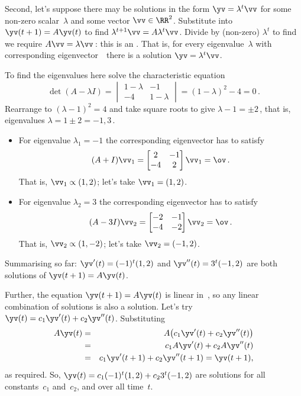 \begin{example}
\begin{solution}
Second, let's suppose there may be solutions in the form \(\yv=\lambda^t\vv\) for some non-zero scalar~\(\lambda\) and some vector \(\vv\in\RR^2\).
Substitute into \(\yv(t+1)=A\yv(t)\) to find \(\lambda^{t+1}\vv=A\lambda^t\vv\). 
Divide by (non-zero) \(\lambda^t\) to find we require \(A\vv=\lambda\vv\)\,: this is an .
That is, for every eigenvalue~\(\lambda\) with corresponding eigenvector~\vv\ there is a solution \(\yv=\lambda^t\vv\).

To find the eigenvalues here solve the characteristic equation 
\begin{equation*}
\det(A-\lambda I)=\begin{vmatrix} 1-\lambda&-1\\-4&1-\lambda \end{vmatrix}=(1-\lambda)^2-4=0\,.
\end{equation*}
Rearrange to \((\lambda-1)^2=4\) and take square roots to give \(\lambda-1=\pm2\)\,, that is, eigenvalues \(\lambda=1\pm2=-1,3\)\,.
\begin{itemize}
\item For eigenvalue \(\lambda_1=-1\) the corresponding eigenvector has to satisfy
\begin{equation*}
(A+I)\vv_1=\begin{bmatrix} 2&-1\\-4&2 \end{bmatrix}\vv_1=\ov\,.
\end{equation*}
That is, \(\vv_1\propto (1,2)\); let's take \(\vv_1=(1,2)\).

\item For eigenvalue \(\lambda_2=3\) the corresponding eigenvector has to satisfy
\begin{equation*}
(A-3I)\vv_2=\begin{bmatrix} -2&-1\\-4&-2 \end{bmatrix}\vv_2=\ov\,.
\end{equation*}
That is, \(\vv_2\propto (1,-2)\); let's take \(\vv_2=(-1,2)\).
\end{itemize}
Summarising so far: \(\yv'(t)=(-1)^t(1,2)\) and \(\yv''(t)=3^t(-1,2)\) are both solutions of \(\yv(t+1)=A\yv(t)\).

Further, the equation \(\yv(t+1)=A\yv(t)\) is linear in~\yv, so any linear combination of solutions is also a solution.
Let's try \(\yv(t)=c_1\yv'(t)+c_2\yv''(t)\).
Substituting
\begin{eqnarray*}
A\yv(t)&=&A\big(c_1\yv'(t)+c_2\yv''(t)\big)
\\&=&c_1A\yv'(t)+c_2A\yv''(t)
\\&=&c_1\yv'(t+1)+c_2\yv''(t+1)
=\yv(t+1),
\end{eqnarray*}
as required.
So, \(\yv(t)=c_1(-1)^t(1,2)+c_23^t(-1,2)\) are solutions for all constants~\(c_1\) and~\(c_2\), and over all time~\(t\).


\end{solution}
\end{example}
